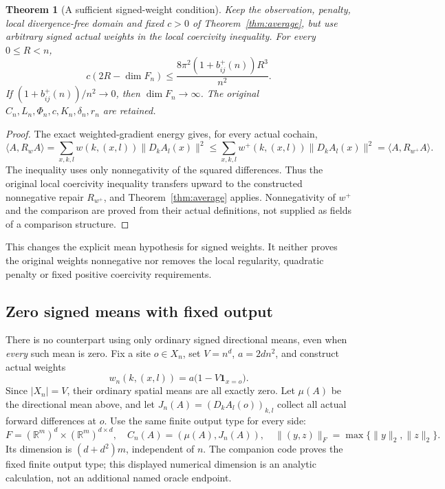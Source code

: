 \documentclass[11pt]{article}
\newtheorem{theorem}{Theorem}[section]
\newcommand{\R}{\mathbb R}
\newcommand{\ip}[2]{\langle #1,#2\rangle}
\begin{document}
\begin{theorem}[A sufficient signed-weight condition]\label{thm:signed-positive}
Keep the observation, penalty, local divergence-free domain and fixed
$c>0$ of Theorem~\ref{thm:average}, but use arbitrary signed actual weights
in the local coercivity inequality. For every $0\leq R<n$,
\[
 c(2R-\dim F_n)\leq
       \frac{8\pi^2(1+b^+_{ij}(n))R^3}{n^2}.
\]
If $(1+b^+_{ij}(n))/n^2\to0$, then $\dim F_n\to\infty$.
The original $C_n,L_n,\Phi_n,c,K_n,\delta_n,r_n$ are retained.
\end{theorem}
\begin{proof}
The exact weighted-gradient energy gives, for every actual cochain,
\[
 \ip{A}{R_w A}=\sum_{x,k,l}w(k,(x,l))\|D_k A_l(x)\|^2
       \leq\sum_{x,k,l}w^+(k,(x,l))\|D_k A_l(x)\|^2
       =\ip{A}{R_{w^+}A}.
\]
The inequality uses only nonnegativity of the squared differences.
Thus the original local coercivity inequality transfers upward to the
constructed nonnegative repair $R_{w^+}$, and Theorem~\ref{thm:average}
applies. Nonnegativity of $w^+$ and the comparison are proved from their
actual definitions, not supplied as fields of a comparison structure.
\end{proof}
This changes the explicit mean hypothesis for signed weights. It neither
proves the original weights nonnegative nor removes the local regularity,
quadratic penalty or fixed positive coercivity requirements.

\subsection{Zero signed means with fixed output}
There is no counterpart using only ordinary signed directional means,
even when \emph{every} such mean is zero. Fix a site $o\in X_n$, set
$V=n^d$, $a=2dn^2$, and construct actual weights
\[
 w_n(k,(x,l))=a\bigl(1-V\mathbf1_{x=o}\bigr).
\]
Since $|X_n|=V$, their ordinary spatial means are all exactly zero.
Let $\mu(A)$ be the directional mean above, and let
$J_n(A)=(D_k A_l(o))_{k,l}$ collect all actual forward differences at $o$.
Use the same finite output type for every side:
\[
 F=(\R^m)^d\times(\R^m)^{d\times d},\quad
 C_n(A)=(\mu(A),J_n(A)),\quad
 \|(y,z)\|_F=\max\{\|y\|_2,\|z\|_2\}.
\]
Its dimension is $(d+d^2)m$, independent of $n$. The companion code proves
the fixed finite output type; this displayed numerical dimension is an
analytic calculation, not an additional named oracle endpoint.
\end{document}

